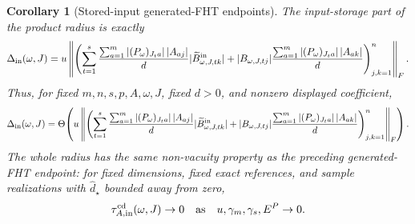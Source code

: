 \documentclass[11pt]{article}
\newtheorem{corollary}[theorem]{Corollary}
\theoremstyle{remark}
\begin{document}
\begin{corollary}[Stored-input generated-FHT endpoints]
The input-storage part of the product radius is exactly
\[
  \Delta_{\rm in}(\omega,J)
  =
  u
  \left\|
    \left(
      \sum_{t=1}^s
      \frac{\sum_{a=1}^m |(P_\omega)_{J_ta}|\,|A_{aj}|}{d}
        |\widetilde B^{{\rm in}}_{\omega,J,tk}|
      +
      |B_{\omega,J,tj}|
      \frac{\sum_{a=1}^m |(P_\omega)_{J_ta}|\,|A_{ak}|}{d}
    \right)_{j,k=1}^n
  \right\|_F .
\]
Thus, for fixed \(m,n,s,p,A,\omega,J\), fixed \(d>0\), and nonzero displayed
coefficient,
\[
  \Delta_{\rm in}(\omega,J)
  =
  \Theta\!\left(
    u
    \left\|
      \left(
        \sum_{t=1}^s
        \frac{\sum_{a=1}^m |(P_\omega)_{J_ta}|\,|A_{aj}|}{d}
          |\widetilde B^{{\rm in}}_{\omega,J,tk}|
        +
        |B_{\omega,J,tj}|
        \frac{\sum_{a=1}^m |(P_\omega)_{J_ta}|\,|A_{ak}|}{d}
      \right)_{j,k=1}^n
    \right\|_F
  \right).
\]
The whole radius has the same non-vacuity property as the preceding
generated-FHT endpoint: for fixed dimensions, fixed exact references, and
sample realizations with \(\widehat d_\star\) bounded away from zero,
\[
  \tau_{A,{\rm in}}^{\rm cd}(\omega,J)\to0
  \quad\text{as}\quad
  u,\gamma_m,\gamma_s,E^P\to0.
\]
\end{corollary}
\end{document}
